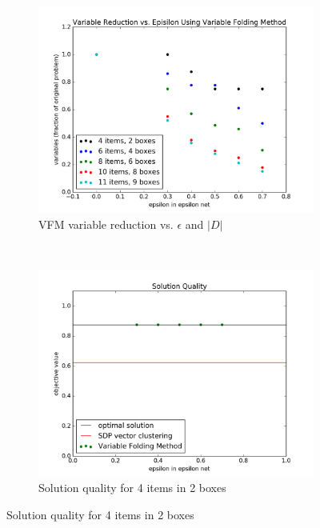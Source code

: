 \documentclass[12pt]{article} %
\begin{document}
\begin{figure}[htb]
\centering
	\begin{subfigure}[b]{0.45\textwidth}
	\centering
	\includegraphics[width=\textwidth]{variables_epsilon_pigeon}
	\caption{VFM variable reduction vs. $\epsilon$ and $|D|$}
	\label{pigeon-reduction}
	\end{subfigure}
	~
	\begin{subfigure}[b]{0.45\textwidth}
	\centering
	\includegraphics[width=\textwidth]{solution_epsilon_n4m2}
	\caption{Solution quality for 4 items in 2 boxes}
	\label{n4m2}
	\end{subfigure}


\end{figure}
\end{document}
